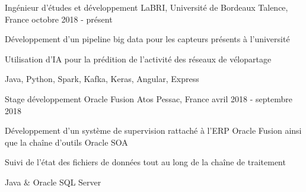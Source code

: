 
\begin{cventries}
	\cventry
	{Ingénieur d'études et développement}
	{LaBRI, Université de Bordeaux}
	{Talence, France}
	{octobre 2018 - présent}
	{
		\begin{cvitems}
			\item {Développement d'un pipeline big data pour les capteurs présents à l'université}
			\item {Utilisation d'IA pour la prédition de l'activité des réseaux de vélopartage}
			\item {Java, Python, Spark, Kafka, Keras, Angular, Express}
		\end{cvitems}
	}
	
	\cventry
	{Stage développement Oracle Fusion}
	{Atos}
	{Pessac, France}
	{avril 2018 - septembre 2018}
	{
		\begin{cvitems}
			\item {Développement d'un système de supervision rattaché à l'ERP Oracle Fusion ainsi que la chaîne d'outils Oracle SOA}
			\item {Suivi de l'état des fichiers de données tout au long de la chaîne de traitement}
			\item {Java \& Oracle SQL Server}
		\end{cvitems}
	}
	
\end{cventries}